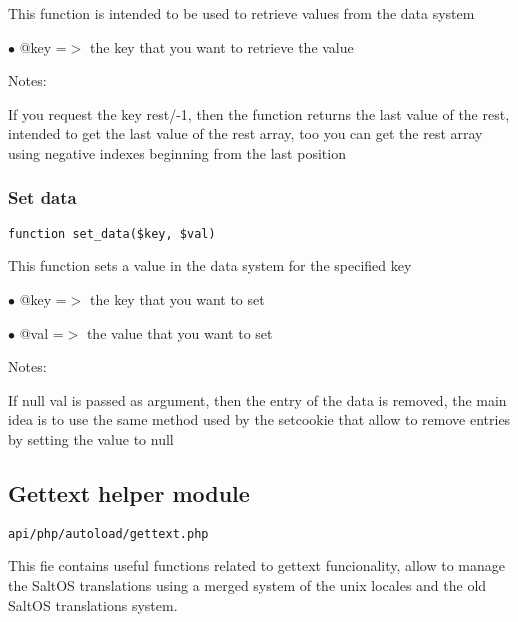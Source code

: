 \documentclass[a4paper]{article}
\begin{document}
This function is intended to be used to retrieve values from the
data system

\begin{compactitem}
\item[\color{myblue}$\bullet$] @key =$>$ the key that you want to retrieve the value
\end{compactitem}

Notes:

If you request the key rest/-1, then the function returns the last
value of the rest, intended to get the last value of the rest array,
too you can get the rest array using negative indexes beginning
from the last position

\hypertarget{toc148}{}
\subsubsection{Set data}

\begin{lstlisting}
function set_data($key, $val)
\end{lstlisting}

This function sets a value in the data system for the specified key

\begin{compactitem}
\item[\color{myblue}$\bullet$] @key =$>$ the key that you want to set
\item[\color{myblue}$\bullet$] @val =$>$ the value that you want to set
\end{compactitem}

Notes:

If null val is passed as argument, then the entry of the data is removed,
the main idea is to use the same method used by the setcookie that allow
to remove entries by setting the value to null

\hypertarget{toc149}{}
\subsection{Gettext helper module}

\begin{lstlisting}
api/php/autoload/gettext.php
\end{lstlisting}

This fie contains useful functions related to gettext funcionality, allow to manage the
SaltOS translations using a merged system of the unix locales and the old SaltOS translations
system.

\hypertarget{toc150}{}
\end{document}
